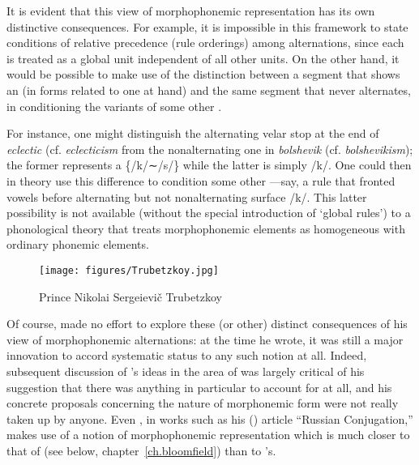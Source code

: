 It is evident that this view of morphophonemic representation has its
own distinctive consequences. For example, it is impossible in this
framework to state conditions of relative precedence (rule orderings)
among alternations, since each  is treated as a global unit
independent of all other units. On the other hand, it would be
possible to make use of the distinction between a segment that shows
an  (in forms related to one at hand) and the same segment
that never alternates, in conditioning the variants of some other
.

For instance, one might distinguish the alternating velar stop at the
end of \emph{eclectic} (cf. \emph{eclecticism} from the nonalternating
one in \emph{bolshevik} (cf. \emph{bolshevikism}); the former
represents a  \{/k/∼/s/\} while the latter is simply
/k/. One could then in theory use this difference to condition some
other —say, a rule that fronted vowels before alternating
but not nonalternating surface /k/. This latter possibility is not
available (without the special introduction of `global {rules}') to a
phonological theory that treats morphophonemic elements as homogeneous
with ordinary phonemic elements.

\begin{wrapfigure}{r}{.35\textwidth}
  \texttt{[image: figures/Trubetzkoy.jpg]}
  \caption{Prince Nikolai Sergeievič Trubetzkoy}
  \label{fig:ch.prague_trubetzkoy}
\end{wrapfigure}
Of course, {\Trubetzkoy} made no effort to explore these (or other)
distinct consequences of his view of morphophonemic alternations: at
the time he wrote, it was still a major innovation to accord
systematic status to any such notion at all. Indeed, subsequent
discussion of {\Trubetzkoy}'s ideas in the area of  was
largely critical of his suggestion that there was anything in
particular to account for at all, and his concrete proposals
concerning the nature of morphonemic form were not really taken up by
anyone. Even {\Jakobson}, in works such as his
(\citeyear{jakobson48:russian.conjugation}) article ``{Russian}
Conjugation,'' makes use of a notion of morphophonemic representation
which is much closer to that of {\Bloomfield} (see below,
chapter~\ref{ch.bloomfield}) than to {\Trubetzkoy}'s.


